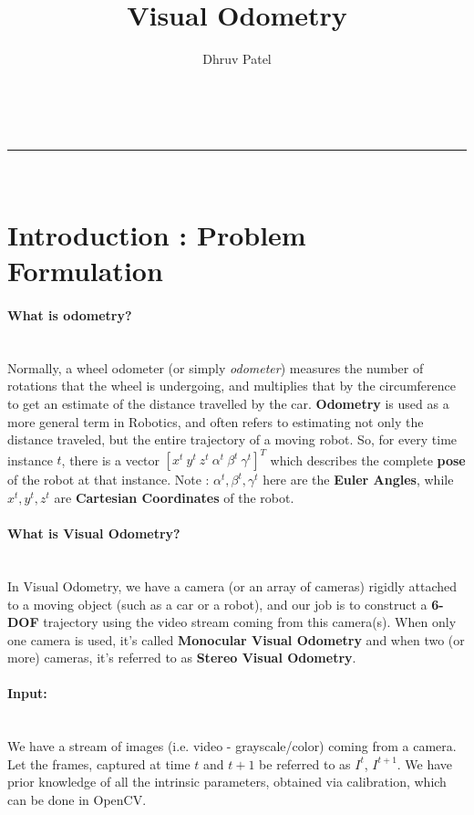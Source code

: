 \documentclass[a4paper,12pt]{extarticle}
\makeatletter
\newcommand{\linia}{\rule{\linewidth}{0.5pt}}
\theoremstyle{mytheor}
\renewcommand{\maketitle}{
\begin{center}
\vspace{2ex}
{\huge \@title}
\vspace{1ex}
\\
\linia\\
\@author \hfill \@date
\vspace{4ex}
\end{center}
}
\makeatother
\begin{document}
\title{Visual Odometry }

\author{ Dhruv Patel }

\maketitle

\tableofcontents
\newpage

\section{Introduction : Problem Formulation} %
\paragraph*{What is odometry?}
\mbox{}\\
Normally, a wheel odometer (or simply \emph{odometer}) measures the number of rotations that the wheel is undergoing, and multiplies that by the circumference to get an estimate of the distance travelled by the car. \textbf{Odometry} is used as a more general term in Robotics, and often refers to estimating not only the distance traveled, but the entire trajectory of a moving robot. So, for every time instance $t$, there is a vector $[x^t \: y^t \: z^t \: \alpha^{t} \: \beta^{t} \: \gamma^{t}]^{T}$ which describes the complete \textbf{pose} of the robot at that instance. \newline
Note : $ \alpha^{t}, \beta^{t}, \gamma^{t} $ here are the \textbf{Euler Angles}, while $ x^t, y^t, z^t $ are \textbf{Cartesian Coordinates} of the robot.

\paragraph{What is Visual Odometry?}
\mbox{}\\
In Visual Odometry, we have a camera (or an array of cameras) rigidly attached to a moving object (such as a car or a robot), and our job is to construct a \textbf{6-DOF} trajectory using the video stream coming from this camera(s). When only one camera is used, it's called \textbf{Monocular Visual Odometry} and when two (or more) cameras, it's referred to as \textbf{Stereo Visual Odometry}. 


\paragraph*{Input:}
\mbox{}\\
We have a stream of images (i.e. video - grayscale/color) coming from a camera. Let the frames, captured at time $t$ and $t+1$ be referred to as $I^t$, $I^{t+1}$. We have prior knowledge of all the intrinsic parameters, obtained via calibration, which can be done in OpenCV.
\end{document}
